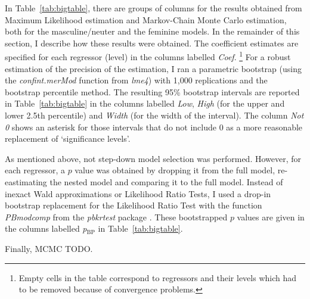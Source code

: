 \documentclass[USenglish]{article}
\newcommand{\Sub}[1]{\ensuremath{\mathrm{_{#1}}}}
\begin{document}
In Table~\ref{tab:bigtable}, there are groups of columns for the results obtained from Maximum Likelihood estimation and Markov-Chain Monte Carlo estimation, both for the masculine\slash neuter and the feminine models.
In the remainder of this section, I describe how these results were obtained.
The coefficient estimates are specified for each regressor (level) in the columns labelled \textit{Coef}.%
\footnote{Empty cells in the table correspond to regressors and their levels which had to be removed because of convergence problems.}
For a robust estimation of the precision of the estimation, I ran a parametric bootstrap (using the \textit{confint.merMod} function from \textit{lme4}) with 1,000 replications and the bootstrap percentile method.
The resulting 95\% bootstrap intervals are reported in Table~\ref{tab:bigtable} in the columns labelled \textit{Low}, \textit{High} (for the upper and lower 2.5th percentile) and \textit{Width} (for the width of the interval).
The column \textit{Not 0} shows an asterisk for those intervals that do not include 0 as a more reasonable replacement of `significance levels'.

As mentioned above, not step-down model selection was performed.
However, for each regressor, a $p$ value was obtained by dropping it from the full model, re-eastimating the nested model and comparing it to the full model.
Instead of inexact Wald approximations or Likelihood Ratio Tests, I used a drop-in bootstrap replacement for the Likelihood Ratio Test with the function \textit{PBmodcomp} from the \textit{pbkrtest} package \citep{HalekohHojsgaard2014}.
These bootstrapped $p$ values are given in the columns labelled \textit{p\Sub{BP}} in Table~\ref{tab:bigtable}.

Finally, MCMC TODO.
\end{document}
